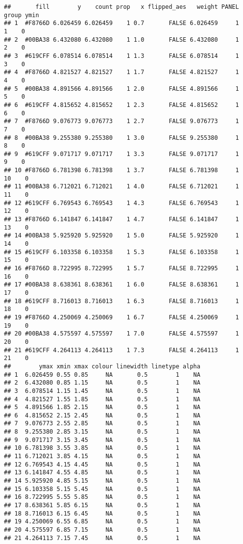 \documentclass[
]{article}
\begin{document}
\begin{verbatim}
##       fill        y    count prop   x flipped_aes   weight PANEL group ymin
## 1  #F8766D 6.026459 6.026459    1 0.7       FALSE 6.026459     1     1    0
## 2  #00BA38 6.432080 6.432080    1 1.0       FALSE 6.432080     1     2    0
## 3  #619CFF 6.078514 6.078514    1 1.3       FALSE 6.078514     1     3    0
## 4  #F8766D 4.821527 4.821527    1 1.7       FALSE 4.821527     1     4    0
## 5  #00BA38 4.891566 4.891566    1 2.0       FALSE 4.891566     1     5    0
## 6  #619CFF 4.815652 4.815652    1 2.3       FALSE 4.815652     1     6    0
## 7  #F8766D 9.076773 9.076773    1 2.7       FALSE 9.076773     1     7    0
## 8  #00BA38 9.255380 9.255380    1 3.0       FALSE 9.255380     1     8    0
## 9  #619CFF 9.071717 9.071717    1 3.3       FALSE 9.071717     1     9    0
## 10 #F8766D 6.781398 6.781398    1 3.7       FALSE 6.781398     1    10    0
## 11 #00BA38 6.712021 6.712021    1 4.0       FALSE 6.712021     1    11    0
## 12 #619CFF 6.769543 6.769543    1 4.3       FALSE 6.769543     1    12    0
## 13 #F8766D 6.141847 6.141847    1 4.7       FALSE 6.141847     1    13    0
## 14 #00BA38 5.925920 5.925920    1 5.0       FALSE 5.925920     1    14    0
## 15 #619CFF 6.103358 6.103358    1 5.3       FALSE 6.103358     1    15    0
## 16 #F8766D 8.722995 8.722995    1 5.7       FALSE 8.722995     1    16    0
## 17 #00BA38 8.638361 8.638361    1 6.0       FALSE 8.638361     1    17    0
## 18 #619CFF 8.716013 8.716013    1 6.3       FALSE 8.716013     1    18    0
## 19 #F8766D 4.250069 4.250069    1 6.7       FALSE 4.250069     1    19    0
## 20 #00BA38 4.575597 4.575597    1 7.0       FALSE 4.575597     1    20    0
## 21 #619CFF 4.264113 4.264113    1 7.3       FALSE 4.264113     1    21    0
##        ymax xmin xmax colour linewidth linetype alpha
## 1  6.026459 0.55 0.85     NA       0.5        1    NA
## 2  6.432080 0.85 1.15     NA       0.5        1    NA
## 3  6.078514 1.15 1.45     NA       0.5        1    NA
## 4  4.821527 1.55 1.85     NA       0.5        1    NA
## 5  4.891566 1.85 2.15     NA       0.5        1    NA
## 6  4.815652 2.15 2.45     NA       0.5        1    NA
## 7  9.076773 2.55 2.85     NA       0.5        1    NA
## 8  9.255380 2.85 3.15     NA       0.5        1    NA
## 9  9.071717 3.15 3.45     NA       0.5        1    NA
## 10 6.781398 3.55 3.85     NA       0.5        1    NA
## 11 6.712021 3.85 4.15     NA       0.5        1    NA
## 12 6.769543 4.15 4.45     NA       0.5        1    NA
## 13 6.141847 4.55 4.85     NA       0.5        1    NA
## 14 5.925920 4.85 5.15     NA       0.5        1    NA
## 15 6.103358 5.15 5.45     NA       0.5        1    NA
## 16 8.722995 5.55 5.85     NA       0.5        1    NA
## 17 8.638361 5.85 6.15     NA       0.5        1    NA
## 18 8.716013 6.15 6.45     NA       0.5        1    NA
## 19 4.250069 6.55 6.85     NA       0.5        1    NA
## 20 4.575597 6.85 7.15     NA       0.5        1    NA
## 21 4.264113 7.15 7.45     NA       0.5        1    NA
\end{verbatim}
\end{document}

